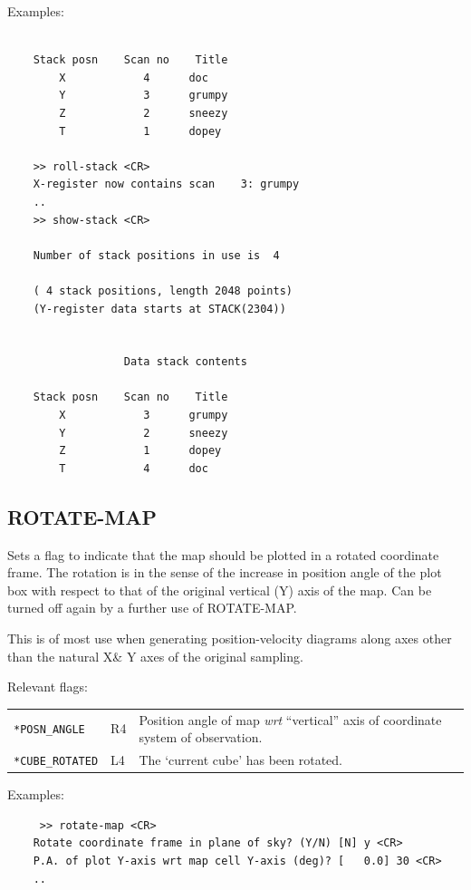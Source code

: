 \documentclass[11pt,twoside]{report}
\begin{document}
Examples:
\begin{verbatim}

    Stack posn    Scan no    Title
        X            4      doc
        Y            3      grumpy
        Z            2      sneezy
        T            1      dopey

    >> roll-stack <CR>
    X-register now contains scan    3: grumpy
    ..
    >> show-stack <CR>

    Number of stack positions in use is  4

    ( 4 stack positions, length 2048 points)
    (Y-register data starts at STACK(2304))


                  Data stack contents

    Stack posn    Scan no    Title
        X            3      grumpy
        Y            2      sneezy
        Z            1      dopey
        T            4      doc

\end{verbatim}

\subsection{ROTATE-MAP} 

Sets a flag to indicate that the map should be plotted in a rotated
coordinate frame. The rotation is in the sense of the increase in
position angle of the plot box with respect to that of the original
vertical (Y) axis of the map. Can be turned off again by a further
use of ROTATE-MAP.

This is of most use when generating position-velocity diagrams along
axes other than the natural X\& Y axes of the original sampling.

Relevant flags:\\
\begin{tabular}{lll}
  \verb+*POSN_ANGLE+ & R4 & \parbox[t]{4in}
                            {Position angle of map {\em wrt} ``vertical''
                             axis of coordinate system of observation.}\\
  \verb+*CUBE_ROTATED+ & L4 & The `current cube' has been rotated.\\
\end{tabular}

Examples:
\begin{verbatim}
     >> rotate-map <CR>
    Rotate coordinate frame in plane of sky? (Y/N) [N] y <CR>
    P.A. of plot Y-axis wrt map cell Y-axis (deg)? [   0.0] 30 <CR>
    ..
\end{verbatim}
\end{document}
